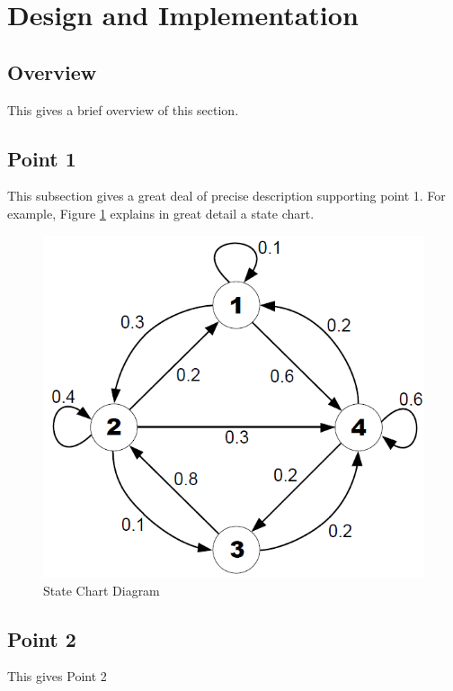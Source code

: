 \section{Design and Implementation}
\label{sec:DesignImplementation}

\subsection{Overview} 
This gives a brief overview of this section.

\subsection{Point 1}
This subsection gives a great deal of precise description supporting point 1.  For example,
Figure \ref{State Chart 3} explains in great detail a state chart.

\begin{figure}[htb]
\centering
\includegraphics[width=.5\textwidth]{section03/assets/sample_image.png}
\caption[Short Caption 3]{\label{State Chart 3}State Chart Diagram}
\end{figure}

\subsection{Point 2}
This gives Point 2
